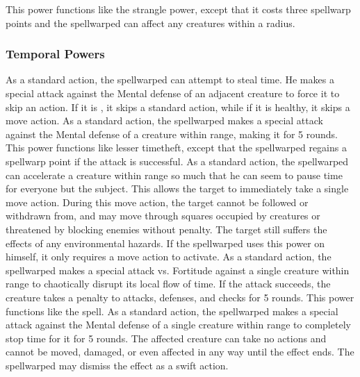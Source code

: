 This power functions like the strangle power, except that it costs three spellwarp points and the spellwarped can affect any creatures within a \areasmall radius.

\subsubsection{Temporal Powers}
As a standard action, the spellwarped can attempt to steal time.
He makes a special attack against the Mental defense of an adjacent creature to force it to skip an action.
If it is \bloodied, it skips a standard action, while if it is healthy, it skips a move action.
As a standard action, the spellwarped makes a special attack against the Mental defense of a creature within \rngclose range, making it \slowed for 5 rounds.
This power functions like lesser timetheft, except that the spellwarped regains a spellwarp point if the attack is successful.
As a standard action, the spellwarped can accelerate a creature within \rngclose range so much that he can seem to pause time for everyone but the subject.
This allows the target to immediately take a single move action.
During this move action, the target cannot be followed or withdrawn from, and may move through squares occupied by creatures or threatened by blocking enemies without penalty.
The target still suffers the effects of any environmental hazards.
If the spellwarped uses this power on himself, it only requires a move action to activate.
As a standard action, the spellwarped makes a special attack vs. Fortitude against a single creature within \rngmed range to chaotically disrupt its local flow of time.
If the attack succeeds, the creature takes a  penalty to attacks, defenses, and checks for 5 rounds.
 This power functions like the 
spell.
As a standard action, the spellwarped makes a special attack against the Mental defense of a single creature within \rngclose range to completely stop time for it for 5 rounds.
The affected creature can take no actions and cannot be moved, damaged, or even affected in any way until the effect ends.
The spellwarped may dismiss the effect as a swift action.

